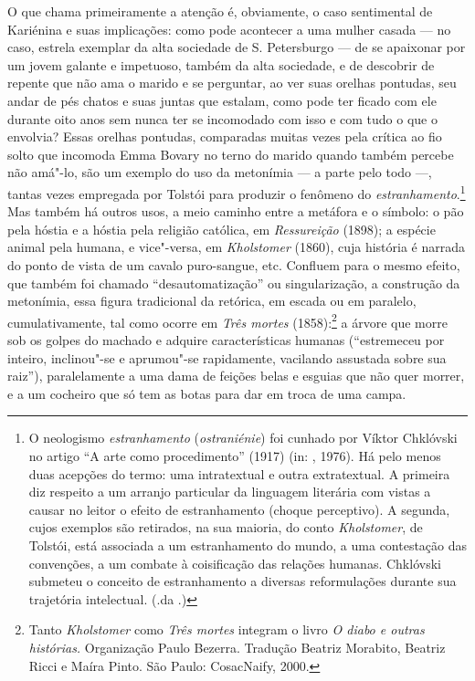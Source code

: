 O que chama primeiramente a atenção é, obviamente, o caso sentimental de
Kariénina e suas implicações: como pode acontecer a uma mulher
casada --- no caso, estrela exemplar da alta sociedade de S.
Petersburgo --- de se apaixonar por um jovem galante e impetuoso, também
da alta sociedade, e de descobrir de repente que não ama o marido e se
perguntar, ao ver suas orelhas pontudas, seu andar de pés chatos e suas
juntas que estalam, como pode ter ficado com ele durante oito anos sem
nunca ter se incomodado com isso e com tudo o que o envolvia? Essas orelhas
pontudas, comparadas muitas vezes pela crítica ao fio solto que incomoda
Emma Bovary no terno do marido quando também percebe não amá"-lo, são um
exemplo do uso da metonímia --- a parte pelo todo ---, tantas
vezes empregada por Tolstói para produzir o fenômeno do \emph{estranhamento}.\footnote{O neologismo \emph{estranhamento} (\emph{ostraniénie}) foi cunhado por Víktor Chklóvski no artigo “A arte como procedimento” (1917) (in: , 1976). Há pelo menos duas acepções do termo: uma intratextual e outra extratextual.
A primeira diz respeito a um arranjo particular da linguagem literária com vistas a causar no leitor o efeito de estranhamento (choque perceptivo). A segunda, cujos exemplos são retirados, na sua maioria, do conto \emph{Kholstomer}, de
Tolstói, está associada a um estranhamento do mundo, a uma contestação das convenções, a um combate à coisificação das relações humanas. Chklóvski submeteu o conceito de estranhamento a diversas reformulações durante sua trajetória intelectual. (.da .)}
Mas também há outros usos, a meio caminho entre a metáfora e o símbolo:
o pão pela hóstia e a hóstia pela religião católica,
em \emph{Ressureição} (1898); a espécie animal pela
humana, e vice"-versa, em \emph{Kholstomer} (1860),
cuja história é narrada do ponto de vista de um cavalo puro-sangue, etc. Confluem para o
mesmo efeito, que também foi chamado ``desautomatização'' ou
singularização, a construção da metonímia, essa figura tradicional da
retórica, em escada ou em paralelo, cumulativamente, tal como
ocorre em \emph{Três mortes} (1858):\footnote{Tanto \emph{Kholstomer} como \emph{Três mortes} integram o livro
\emph{O diabo e outras histórias.} Organização Paulo Bezerra. Tradução Beatriz
Morabito, Beatriz Ricci e Maíra Pinto. São Paulo: CosacNaify, 2000.} a árvore que morre sob os golpes
do machado e adquire características humanas (``estremeceu por
inteiro, inclinou"-se e aprumou"-se rapidamente, vacilando assustada sobre
sua raiz''), paralelamente a uma dama de feições belas e esguias que
não quer morrer, e a um cocheiro que só tem as botas para dar em troca
de uma campa.

